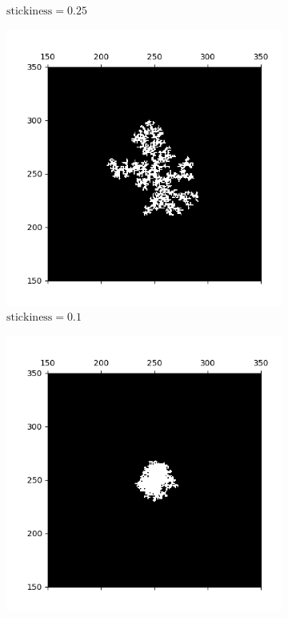 \documentclass[aps,preprint,groupedaddress,letterpaper]{revtex4-1}
\begin{document}
\begin{figure}[h]
\begin{subfigure}[h]{0.23\textwidth}
         \caption{$\text{stickiness} = 0.25$}
         \label{st0.25}
     \end{subfigure}
     \hfill
     \begin{subfigure}[h]{0.23\textwidth}
         \centering
         \includegraphics[width=\textwidth]{img/stickiness/st0.1.png}
         \caption{$\text{stickiness} = 0.1$}
         \label{st0.1}
     \end{subfigure}
     \hfill
     \begin{subfigure}[h]{0.23\textwidth}
         \centering
         \includegraphics[width=\textwidth]{img/stickiness/st0.001.png}

\end{subfigure}
\end{figure}
\end{document}
